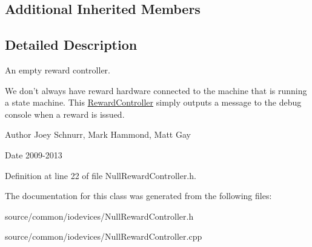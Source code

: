 \subsection*{Additional Inherited Members}


\subsection{Detailed Description}
An empty reward controller. 

We don't always have reward hardware connected to the machine that is running a state machine. This \hyperlink{class_picto_1_1_reward_controller}{Reward\-Controller} simply outputs a message to the debug console when a reward is issued. \begin{DoxyAuthor}{Author}
Joey Schnurr, Mark Hammond, Matt Gay 
\end{DoxyAuthor}
\begin{DoxyDate}{Date}
2009-\/2013 
\end{DoxyDate}


Definition at line 22 of file Null\-Reward\-Controller.\-h.



The documentation for this class was generated from the following files\-:\begin{DoxyCompactItemize}
\item 
source/common/iodevices/Null\-Reward\-Controller.\-h\item 
source/common/iodevices/Null\-Reward\-Controller.\-cpp\end{DoxyCompactItemize}
